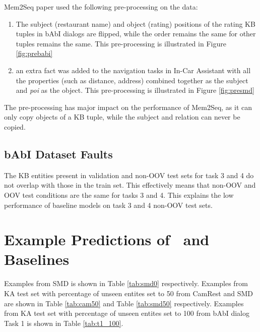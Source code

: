 Mem2Seq paper used the following pre-processing on the data:
\begin{enumerate}
    \item The subject (restaurant name) and object (rating) positions of the rating KB tuples in bAbI dialogs are flipped, while the order remains the same for other tuples remains the same. This pre-processing is illustrated in Figure \ref{fig:prebabi}
    \item an extra fact was added to the navigation tasks in In-Car Assistant with all the properties (such as distance, address) combined together  as the subject and \textit{poi} as the object. This pre-processing is illustrated in Figure \ref{fig:presmd}
\end{enumerate}
The pre-processing has major impact on the performance of  Mem2Seq, as it can only copy objects of a KB tuple, while the subject and relation can never be copied.

\subsection{bAbI Dataset Faults}
\label{sec:fault}
The KB entities present in validation and non-OOV test sets for task 3 and 4 do not overlap with those in the train set. This effectively means that non-OOV and OOV test conditions are the same for tasks 3 and 4. This explains the low performance of baseline models on task 3 and 4 non-OOV test sets.

\section{Example Predictions of \sys\ and Baselines}
\label{sec:examples}
Examples from SMD is shown in Table \ref{tab:smd0} respectively. Examples from KA test set with percentage of unseen entites set to 50 from CamRest and SMD are shown in Table \ref{tab:cam50} and Table \ref{tab:smd50} respectively. Examples from KA test set with percentage of unseen entites set to 100 from bAbI dialog Task 1 is shown in Table \ref{tab:t1_100}.




